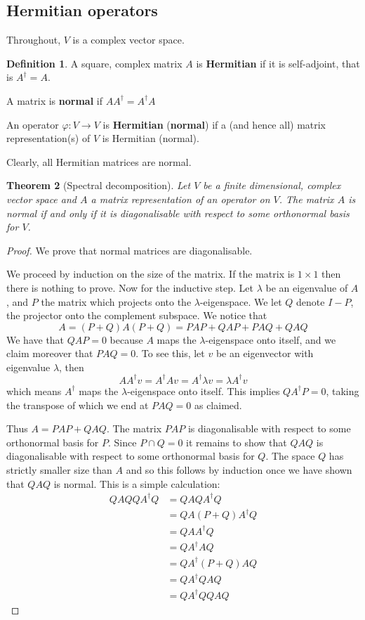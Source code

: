 \documentclass[12pt]{article}
\theoremstyle{plain}
\newtheorem{thm}{Theorem}[subsection] %
\theoremstyle{definition}
\newtheorem{defn}[thm]{Definition} %
\newcommand{\lto}{\longrightarrow}
\begin{document}
\subsection{Hermitian operators}
Throughout, $V$ is a complex vector space.
\begin{defn}
A square, complex matrix $A$ is \textbf{Hermitian} if it is self-adjoint, that is $A^\dagger = A$.

A matrix is \textbf{normal} if $AA^\dagger = A^\dagger A$

An operator $\varphi:V \lto V$ is \textbf{Hermitian} (\textbf{normal}) if a (and hence all) matrix representation(s) of $V$ is Hermitian (normal).
\end{defn}
Clearly, all Hermitian matrices are normal.
\begin{thm}[Spectral decomposition]\label{thm:spectral}
Let $V$ be a finite dimensional, complex vector space and $A$ a matrix representation of an operator on $V$. The matrix $A$ is normal if and only if it is diagonalisable with respect to some orthonormal basis for $V$.
\end{thm}
\begin{proof}
We prove that normal matrices are diagonalisable.

We proceed by induction on the size of the matrix. If the matrix is $1\times 1$ then there is nothing to prove. Now for the inductive step. Let $\lambda$ be an eigenvalue of $A$, and $P$ the matrix which projects onto the $\lambda$-eigenspace. We let $Q$ denote $I - P$, the projector onto the complement subspace.  We notice that
\begin{equation}
A = (P + Q)A(P + Q)= PAP + QAP + PAQ + QAQ
\end{equation}
We have that $QAP = 0$ because $A$ maps the $\lambda$-eigenspace onto itself, and we claim moreover that $PAQ = 0$. To see this, let $v$ be an eigenvector with eigenvalue $\lambda$, then
\begin{equation}
AA^{\dagger}v = A^{\dagger}Av = A^{\dagger} \lambda v = \lambda A^\dagger v
\end{equation}
which means $A^\dagger$ maps the $\lambda$-eigenspace onto itself. This implies $QA^\dagger P = 0$, taking the transpose of which we end at $P A Q = 0$ as claimed.

Thus $A = PAP + QAQ$. The matrix $PAP$ is diagonalisable with respect to some orthonormal basis for $P$. Since $P \cap Q = 0$ it remains to show that $QAQ$ is diagonalisable with respect to some orthonormal basis for $Q$. The space $Q$ has strictly smaller size than $A$ and so this follows by induction once we have shown that $QAQ$ is normal. This is a simple calculation:
\begin{align*}
QAQQA^\dagger Q &= QAQA^\dagger Q\\
&= QA(P + Q)A^\dagger Q\\
&= QAA^\dagger Q\\
&= QA^\dagger AQ\\
&= QA^\dagger (P + Q)AQ\\
&= QA^\dagger QAQ \\
&= QA^\dagger QQ A Q
\end{align*}
\end{proof}
\end{document}
